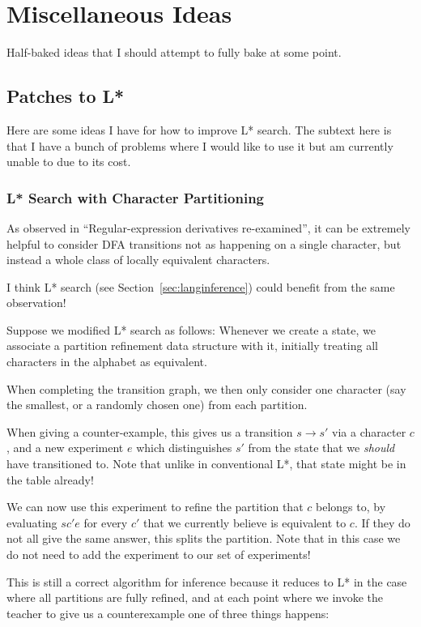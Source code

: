 \documentclass[a4paper]{book}
\begin{document}
\chapter{Miscellaneous Ideas}

Half-baked ideas that I should attempt to fully bake at some point.

\section{Patches to L*}

Here are some ideas I have for how to improve L* search.
The subtext here is that I have a bunch of problems where I would like to use it but am currently unable to due to its cost.

\subsection{L* Search with Character Partitioning}

As observed in ``Regular-expression derivatives re-examined''\cite{DBLP:journals/jfp/OwensRT09},
it can be extremely helpful to consider DFA transitions not as happening on a single character,
but instead a whole class of locally equivalent characters.

I think L* search (see Section~\ref{sec:langinference}) could benefit from the same observation!

Suppose we modified L* search as follows:
Whenever we create a state,
we associate a partition refinement data structure with it,
initially treating all characters in the alphabet as equivalent.

When completing the transition graph,
we then only consider one character (say the smallest, or a randomly chosen one) from each partition.

When giving a counter-example,
this gives us a transition \(s \to s'\) via a character \(c\),
and a new experiment \(e\) which distinguishes \(s'\) from the state that we \emph{should} have transitioned to.
Note that unlike in conventional L*,
that state might be in the table already!

We can now use this experiment to refine the partition that \(c\) belongs to,
by evaluating \(sc'e\) for every \(c'\) that we currently believe is equivalent to \(c\).
If they do not all give the same answer,
this splits the partition.
Note that in this case we do not need to add the experiment to our set of experiments!

This is still a correct algorithm for inference because it reduces to L* in the case where all partitions are fully refined,
and at each point where we invoke the teacher to give us a counterexample one of three things happens:
\end{document}
